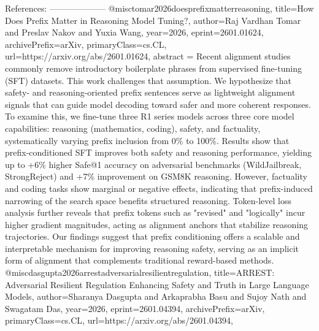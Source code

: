         References:
        --------------------
        @misc{tomar2026doesprefixmatterreasoning,
      title={How Does Prefix Matter in Reasoning Model Tuning?}, 
      author={Raj Vardhan Tomar and Preslav Nakov and Yuxia Wang},
      year={2026},
      eprint={2601.01624},
      archivePrefix={arXiv},
      primaryClass={cs.CL},
      url={https://arxiv.org/abs/2601.01624},
      abstract = {Recent alignment studies commonly remove introductory boilerplate phrases from supervised fine-tuning (SFT) datasets. This work challenges that assumption. We hypothesize that safety- and reasoning-oriented prefix sentences serve as lightweight alignment signals that can guide model decoding toward safer and more coherent responses. To examine this, we fine-tune three R1 series models across three core model capabilities: reasoning (mathematics, coding), safety, and factuality, systematically varying prefix inclusion from 0\% to 100\%.   Results show that prefix-conditioned SFT improves both safety and reasoning performance, yielding up to +6\% higher Safe@1 accuracy on adversarial benchmarks (WildJailbreak, StrongReject) and +7\% improvement on GSM8K reasoning. However, factuality and coding tasks show marginal or negative effects, indicating that prefix-induced narrowing of the search space benefits structured reasoning. Token-level loss analysis further reveals that prefix tokens such as "revised" and "logically" incur higher gradient magnitudes, acting as alignment anchors that stabilize reasoning trajectories. Our findings suggest that prefix conditioning offers a scalable and interpretable mechanism for improving reasoning safety, serving as an implicit form of alignment that complements traditional reward-based methods.}
}@misc{dasgupta2026arrestadversarialresilientregulation,
      title={ARREST: Adversarial Resilient Regulation Enhancing Safety and Truth in Large Language Models}, 
      author={Sharanya Dasgupta and Arkaprabha Basu and Sujoy Nath and Swagatam Das},
      year={2026},
      eprint={2601.04394},
      archivePrefix={arXiv},
      primaryClass={cs.CL},
      url={https://arxiv.org/abs/2601.04394},
}
